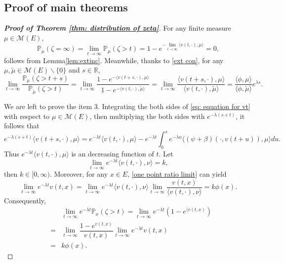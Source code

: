 \documentclass[12pt,a4paper]{amsart}
\theoremstyle{plain}
\theoremstyle{definition}
\numberwithin{equation}{section}
\begin{document}
\subsection{Proof of main theorems}
\begin{proof}[{\bf Proof of Theorem \ref{thm: distribution of zeta}}]
	For any finite measure $\mu\in \mathcal M(E)$,
\[
	\mathbb P_\mu(\zeta=\infty)=\lim_{t\rightarrow\infty}\mathbb P_\mu(\zeta>t)=1-e^{-\lim_{t\rightarrow\infty}\langle v(t,\cdot),\mu\rangle }=0,
\]
	follows from Lemma\ref{lem:extinc}.
	Meanwhile, thanks to \eqref{ext con}, for any $\mu,\tilde\mu\in \mathcal M(E)\backslash\{0\}$ and $s\in\mathbb R$,
\[
	\lim_{t\rightarrow\infty}\frac{\mathbb P_{\mu}(\zeta>t+s)}{\mathbb P_{\tilde\mu}(\zeta>t)}=\lim_{t\rightarrow\infty}\frac{1-e^{-\langle v(t+s,\cdot),\mu\rangle }}{1-e^{-\langle v(t,\cdot),\tilde\mu\rangle }}
	=\lim_{t\rightarrow\infty}\frac{\langle v(t+s,\cdot),\mu\rangle }{\langle v(t,\cdot),\tilde\mu\rangle }=\frac{\langle \phi,\mu\rangle }{\langle \phi,\tilde\mu\rangle }e^{\lambda s}.
\]

	We are left to prove the item $3$.  Integrating the both sides of \eqref{eq: equation for vt} with respect to $\mu\in\mathcal M(E)$, then multiplying the both sides with  $e^{-\lambda(s+t)}$, it follows that
\begin{equation}\label{ext equ int}
	e^{-\lambda(s+t)}\langle v(t+s,\cdot), \mu\rangle =e^{-\lambda t}\langle v(t,\cdot),\mu\rangle -e^{-\lambda t}\int_0^s e^{-\lambda u}\langle (\psi+\beta)(\cdot, v(t+u)),\mu\rangle du.
\end{equation}
	Thus $e^{-\lambda t}\langle v(t,\cdot), \mu\rangle$ is an decreasing function of $t$. Let
\begin{equation}\label{def of k}
 	\lim_{t\to\infty}e^{-\lambda t}\langle v(t,\cdot), \nu\rangle=k,
\end{equation}
 	then $k\in[0,\infty)$. Moreover, for any $x\in E$, \eqref{one point ratio limit} can yield
\[
	\lim_{t\rightarrow\infty}e^{-\lambda t}v(t,x)=\lim_{t\to\infty}e^{-\lambda t}\langle v(t,\cdot),\nu\rangle \lim_{t\to\infty}\dfrac{v(t,x)}{\langle v(t,\cdot),\nu\rangle }=k\phi(x).
\]
	Consequently,
\begin{eqnarray*}
	&&\lim_{t\rightarrow\infty}e^{-\lambda t}\mathbb P_{x}(\zeta>t)=\lim_{t\rightarrow\infty}e^{-\lambda t}\left(1-e^{\langle v(t,x)}\right)\\	
	&=&\lim_{t\rightarrow\infty}\dfrac{1-e^{ v(t,x)}}{v(t,x)}\lim_{t\to\infty}e^{-\lambda t}v(t,x)\\
	&=& k\phi(x).
\end{eqnarray*}


\end{proof}
\end{document}
